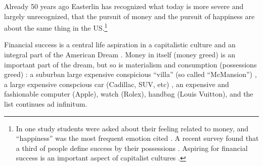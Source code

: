 \documentclass[10pt, letterpaper]{article}
\begin{document}
\begin{spacing}{1.8}
 Already 50 years ago Easterlin has recognized what today is more severe and
 largely unrecognized, that  the pursuit of money and the pursuit of happiness are about the same thing in the US.\footnote{In one study students were asked about their feeling related to money, and ``happiness'' was the most frequent emotion cited \citep{mogilner2010pursuit}.
A recent survey found that a third of people define success by their possessions
\citep[cited in][]{joye20}. Aspiring for financial success is an important
aspect of capitalist cultures \citep{kasser93}.}
%
%
%
%
%
%

Financial success is a central life aspiration in a capitalistic culture and an
integral part of the American Dream \citep{kasser93}. Money in itself (money
greed)  is an
important part of the dream, but so is materialism and consumption (possessions
greed) \citep{kasser16,dittmar14,kasser13,leonard10}: a suburban large expensive conspicious ``villa'' (so called ``McMansion'')
\citep{duany01}, a large expensive conspcious car (Cadillac, SUV, etc)
\citep{aok_ls_car15}, an expensive and fashionable computer (Apple), watch
(Rolex), handbag (Louis Vuitton), and the list continues ad infinitum.


\end{spacing}
\end{document}
